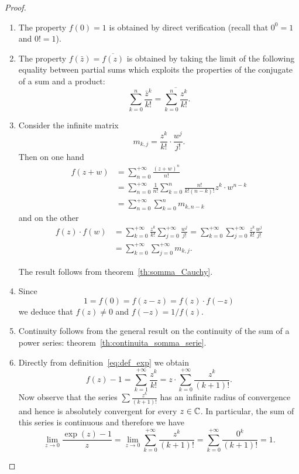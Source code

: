 \begin{proof}
\mymark{*}
\begin{enumerate}
\item
The property $f(0)=1$ is obtained by direct verification (recall that $0^0=1$
and $0!=1$).

\item The property $f(\bar z) = \overline{f(z)}$ is obtained
by taking the limit of the following equality between partial sums
which exploits the properties of the conjugate of a sum and a product:
\[
\sum_{k=0}^{n} \frac{\bar z^k}{k!} = \overline{\sum_{k=0}^n \frac{z^k}{k!}}.
\]

\item
Consider the infinite matrix
\[
m_{k,j}  = \frac{z^k}{k!} \cdot \frac{w^j}{j!}.
\]
Then on one hand
\begin{align*}
 f(z+w)
 &= \sum_{n=0}^{+\infty} \frac{(z+w)^n}{n!}\\
  &= \sum_{n=0}^{+\infty} \frac{1}{n!}\sum_{k=0}^n \frac{n!}{k!(n-k)!} z^k\cdot
 w^{n-k}\\
 &= \sum_{n=0}^{+\infty} \sum_{k=0}^n m_{k, n-k}
\end{align*}
and on the other
\begin{align*}
 f(z) \cdot f(w)
 &= \sum_{k=0}^{+\infty}\frac{z^k}{k!} \sum_{j=0}^{+\infty}\frac{w^j}{j!}
 = \sum_{k=0}^{+\infty}\sum_{j=0}^{+\infty}\frac{z^k}{k!} \frac{w^j}{j!} \\
 &= \sum_{k=0}^{+\infty}\sum_{j=0}^{+\infty} m_{k,j}.
\end{align*}

The result follows from theorem~\ref{th:somma_Cauchy}.

\item
Since
\[
  1 = f(0) = f(z-z) = f(z) \cdot f(-z)
\]
we deduce that $f(z)\neq 0$ and $f(-z) =  1 / f(z)$.

\item
Continuity follows from the general result on the continuity of
the sum of a power series: theorem~\ref{th:continuita_somma_serie}.

\item
Directly from definition~\eqref{eq:def_exp}
we obtain
\[
 f(z) - 1 = \sum_{k=1}^{+\infty} \frac{z^k}{k!}
 = z \cdot \sum_{k=0}^{+\infty} \frac{z^k}{(k+1)!}.
\]
Now observe that the series $\sum \frac{z^k}{(k+1)!}$ has an infinite radius of
convergence and hence is absolutely convergent for every $z\in {\mathbb C}$.
In particular, the sum of this series is continuous and
therefore we have
\[
\lim_{z\to 0}\frac{\exp(z) - 1}{z}
   =  \lim_{z\to 0} \sum_{k=0}^{+\infty} \frac{z^k}{(k+1)!}
   = \sum_{k=0}^{+\infty}\frac{0^k}{(k+1)!} = 1.
\]
\end{enumerate}
\end{proof}

